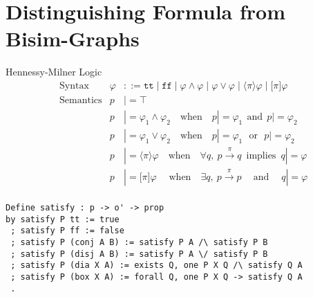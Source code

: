 \documentclass{llncs}
\begin{document}
\section{Distinguishing Formula from Bisim-Graphs}\label{sec:ccsdf}
Hennessy-Milner Logic
\begin{align*}
&\text{Syntax} &
\varphi & ::= \texttt{tt} \mid \texttt{ff}
    \mid \varphi \land \varphi \mid \varphi \lor \varphi
    \mid \langle\pi\rangle \varphi \mid \lbrack\pi\rbrack \varphi
\\
&\text{Semantics} &
  p & |= \top \\&&
  p & |= \varphi_1 \land \varphi_2 \quad\text{when}\quad p |= \varphi_1 ~~\text{and}~~ p |= \varphi_2 \\&&
  p & |= \varphi_1 \lor \varphi_2 \quad\text{when}\quad p |= \varphi_1 ~~~\text{or}~~~ p |= \varphi_2 \\&&
  p & |= \langle \pi \rangle \varphi \quad\text{when}\quad \forall q,~ p\xrightarrow{\pi} q ~\;\text{implies}~\; q |= \varphi \\&&
  p & |= \lbrack \pi \rbrack \varphi \;\quad\text{when}\quad \exists q,~ p\xrightarrow{\pi} p ~\quad\text{and}\quad\; q |= \varphi \\&&
\end{align*}

\begin{verbatim}
Define satisfy : p -> o' -> prop
by satisfy P tt := true
 ; satisfy P ff := false
 ; satisfy P (conj A B) := satisfy P A /\ satisfy P B
 ; satisfy P (disj A B) := satisfy P A \/ satisfy P B
 ; satisfy P (dia X A) := exists Q, one P X Q /\ satisfy Q A
 ; satisfy P (box X A) := forall Q, one P X Q -> satisfy Q A
 .
\end{verbatim}
\end{document}
